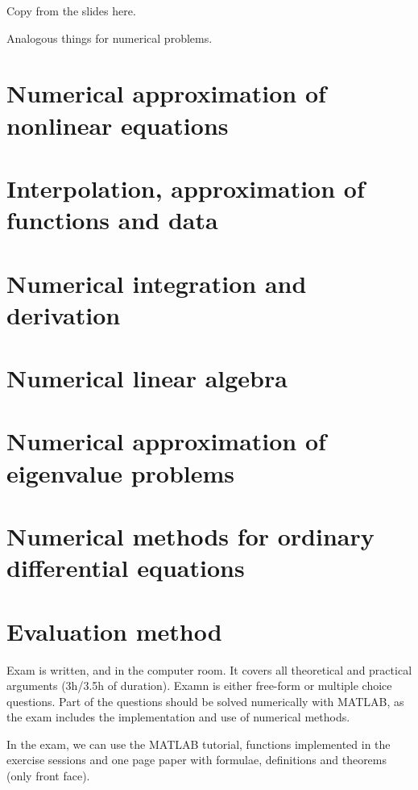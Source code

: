 \documentclass[palatino]{epflnotes}
\begin{document}
Copy from the slides here.

Analogous things for numerical problems.

\chapter{Numerical approximation of nonlinear equations}

\chapter{Interpolation, approximation of functions and data}

\chapter{Numerical integration and derivation}

\chapter{Numerical linear algebra}

\chapter{Numerical approximation of eigenvalue problems}

\chapter{Numerical methods for ordinary differential equations}

\appendix

\chapter{Evaluation method}

Exam is written, and in the computer room. It covers all theoretical and practical arguments (3h/3.5h of duration). Examn is either free-form or multiple choice questions. Part of the questions should be solved numerically with MATLAB, as the exam includes the implementation and use of numerical methods.

In the exam, we can use the MATLAB tutorial, functions implemented in the exercise sessions and one page paper with formulae, definitions and theorems (only front face).

% 


\backmatter

\nocite{scientificComputingMatlab}


\printindex
\end{document}
